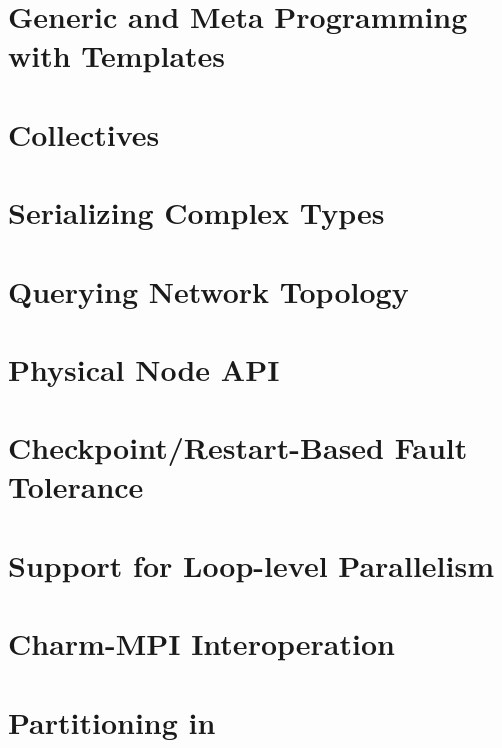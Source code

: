 \documentclass[10pt]{report}
\begin{document}
\chapter{Generic and Meta Programming with Templates}
\label{templates}
  

\chapter{Collectives}
  

\chapter{Serializing Complex Types}
  

\chapter{Querying Network Topology}
\label{topo}
  


\chapter{Physical Node API}
\label{physical}
  

\chapter{Checkpoint/Restart-Based Fault Tolerance}
\label{sec:checkpoint}
  

\chapter{Support for Loop-level Parallelism}
\label{sec:looplevel}


\chapter{Charm-MPI Interoperation}
\label{sec:interop}
  

\chapter{Partitioning in \charmpp}
\label{sec:partition}
  
\end{document}
